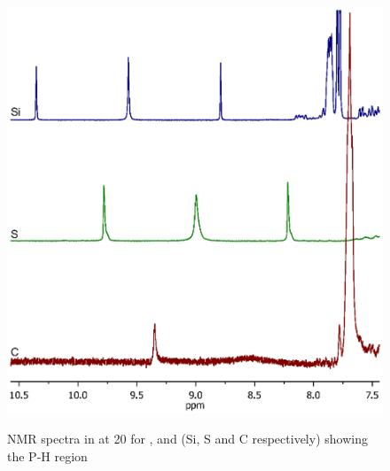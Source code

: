 {%

\begin{figure}[htb]
\begin{center}
\vspace{0.5cm}
\includegraphics[scale = 0.8, trim = 1.5cm 10cm 4.5cm 5cm, clip]{../NMR/Phosphoniumstacked.eps}
\caption[\proton{} NMR spectra for \tBusixantphos, \tButhixantphos{} and \tBuxantphos{} showing the P-H region]{\proton{} NMR spectra in  at 20\degC{} for \tBusixantphos, \tButhixantphos{} and \tBuxantphos{} (Si, S and C respectively) showing the P-H region}
\vspace{0.2cm}
\label{Protonatedligandsnmr}
\end{center}
\end{figure}
\vspace{0.2cm}


}
